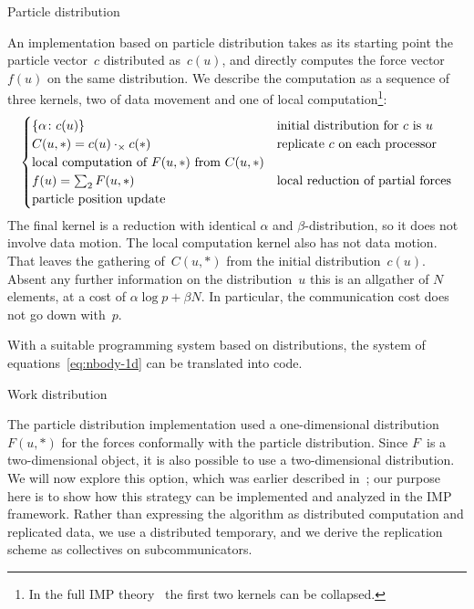  {Particle distribution}

\def\dottimes{\mathbin{\cdot_\times}}

An implementation based on particle distribution takes as its starting
point the particle vector~$c$ distributed as~$c(u)$, and
directly computes the force vector $f(u)$ on the same distribution.
We describe the
computation as a sequence of three kernels, two of data movement and
one of local computation\footnote{In the full \ac{IMP}
  theory~\cite{Eijkhout:ICCS2012} the first two kernels can be
  collapsed.}:
\begin{equation}
  \begin{cases}
    \{ \alpha\colon c(u) \}&\hbox{initial distribution for $c$ is $u$}\\
    C(u,*) = c(u)\dottimes c(*)&\hbox{replicate $c$ on each processor}\\
    \hbox{local computation of $F(u,*)$ from $C(u,*)$}\\
    f(u) = \sum_2 F(u,*)&\hbox{local reduction of partial forces}\\
    \hbox{particle position update}
  \end{cases}
  \label{eq:nbody-1d}
\end{equation}
The final kernel is a reduction with identical $\alpha$ and
$\beta$-distribution, so it does not involve data motion.
The local computation kernel also has not data motion.
That leaves the gathering of~$C(u,*)$ from the initial
distribution~$c(u)$. Absent any further information on the 
distribution~$u$ this is an allgather of $N$ elements,
at a cost of $\alpha\log p+\beta N$.
In particular, the communication cost does not go down
with~$p$.

With a suitable programming system based on distributions,
the system of equations~\eqref{eq:nbody-1d} can be
translated into code.

 {Work distribution}

The particle distribution implementation used a one-dimensional
distribution $F(u,*)$ for the forces conformally with the particle
distribution. Since $F$~is a two-dimensional object, it is also
possible to use a two-dimensional distribution. We will now explore
this option, which was earlier described
in~\cite{Driscoll:optimal-nbody}; our purpose here is to show how this
strategy can be implemented and analyzed in the \ac{IMP} framework.
Rather than expressing the algorithm as
distributed computation and replicated data, we use a
distributed temporary, and we derive the replication scheme
as collectives on subcommunicators. 

